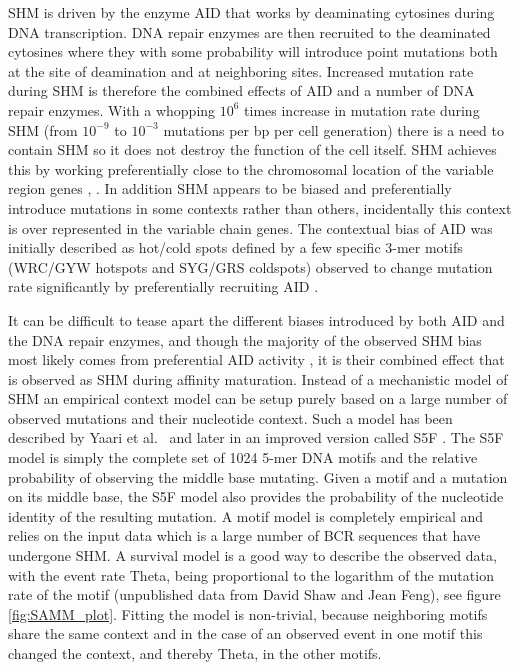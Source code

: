 SHM is driven by the enzyme AID that works by deaminating cytosines during DNA transcription.
DNA repair enzymes are then recruited to the deaminated cytosines where they with some probability will introduce point mutations both at the site of deamination and at neighboring sites.
Increased mutation rate during SHM is therefore the combined effects of AID and a number of DNA repair enzymes.
With a whopping $10^6$ times increase in mutation rate during SHM (from $10^{-9}$ to $10^{-3}$ mutations per bp per cell generation) there is a need to contain SHM so it does not destroy the function of the cell itself.
SHM achieves this by working preferentially close to the chromosomal location of the variable region genes \cite{Yeap_2015}, \cite{liu2008two}.
In addition SHM appears to be biased and preferentially introduce mutations in some contexts rather than others, incidentally this context is over represented in the variable chain genes.
The contextual bias of AID was initially described as hot/cold spots defined by a few specific 3-mer motifs (WRC/GYW hotspots and SYG/GRS coldspots) observed to change mutation rate significantly by preferentially recruiting AID \cite{pham2003processive}.

It can be difficult to tease apart the different biases introduced by both AID and the DNA repair enzymes, and though the majority of the observed SHM bias most likely comes from preferential AID activity \cite{Pham_2016}, it is their combined effect that is observed as SHM during affinity maturation.
Instead of a mechanistic model of SHM an empirical context model can be setup purely based on a large number of observed mutations and their nucleotide context.
Such a model has been described by Yaari et al.\ \cite{yaari2013models} and later in an improved version called S5F \cite{cui2016model}.
The S5F model is simply the complete set of 1024 5-mer DNA motifs and the relative probability of observing the middle base mutating.
Given a motif and a mutation on its middle base, the S5F model also provides the probability of the nucleotide identity of the resulting mutation.
A motif model is completely empirical and relies on the input data which is a large number of BCR sequences that have undergone SHM.
A survival model \cite{cox1992regression} is a good way to describe the observed data, with the event rate Theta, being proportional to the logarithm of the mutation rate of the motif (unpublished data from David Shaw and Jean Feng), see figure \ref{fig:SAMM_plot}.
Fitting the model is non-trivial, because neighboring motifs share the same context and in the case of an observed event in one motif this changed the context, and thereby Theta, in the other motifs.

